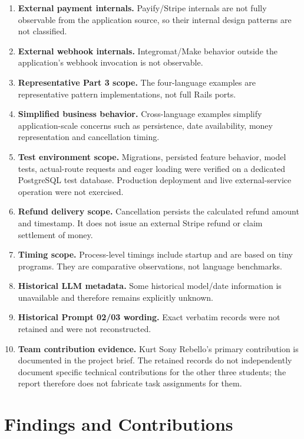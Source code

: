 \documentclass[10pt,a4paper]{article}
\begin{document}
\begin{enumerate}[leftmargin=*]
\item \textbf{External payment internals.} Payify/Stripe internals are not fully observable from the application source, so their internal design patterns are not classified.
\item \textbf{External webhook internals.} Integromat/Make behavior outside the application's webhook invocation is not observable.
\item \textbf{Representative Part 3 scope.} The four-language examples are representative pattern implementations, not full Rails ports.
\item \textbf{Simplified business behavior.} Cross-language examples simplify application-scale concerns such as persistence, date availability, money representation and cancellation timing.
\item \textbf{Test environment scope.} Migrations, persisted feature behavior, model tests, actual-route requests and eager loading were verified on a dedicated PostgreSQL test database. Production deployment and live external-service operation were not exercised.
\item \textbf{Refund delivery scope.} Cancellation persists the calculated refund amount and timestamp. It does not issue an external Stripe refund or claim settlement of money.
\item \textbf{Timing scope.} Process-level timings include startup and are based on tiny programs. They are comparative observations, not language benchmarks.
\item \textbf{Historical LLM metadata.} Some historical model/date information is unavailable and therefore remains explicitly unknown.
\item \textbf{Historical Prompt 02/03 wording.} Exact verbatim records were not retained and were not reconstructed.
\item \textbf{Team contribution evidence.} Kurt Sony Rebello's primary contribution is documented in the project brief. The retained records do not independently document specific technical contributions for the other three students; the report therefore does not fabricate task assignments for them.
\end{enumerate}

\section{Findings and Contributions}
\end{document}
